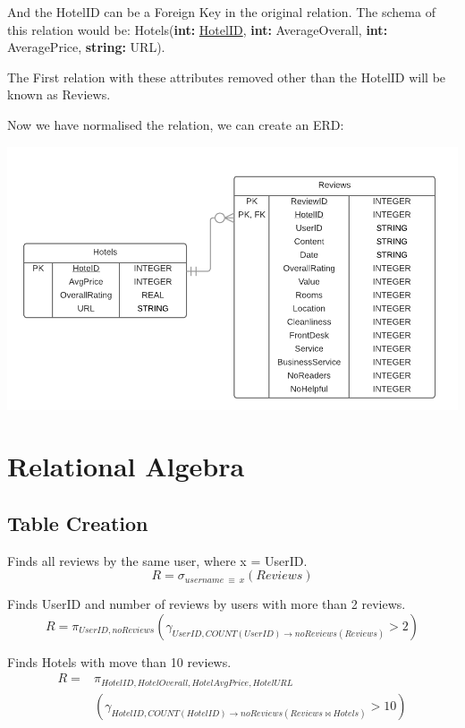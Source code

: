 \documentclass[11pt,epsfig]{article}
\begin{document}
And the HotelID can be a Foreign Key in the original relation.
The schema of this relation would be:
Hotels(\textbf{int:} \underline{HotelID}, \textbf{int:} AverageOverall, \textbf{int:} AveragePrice, \textbf{string:} URL).

The First relation with these attributes removed other than the HotelID will be known as Reviews.

Now we have normalised the relation, we can create an ERD:

\includegraphics[scale=0.6]{ERD_DIAGRAM.png} 

\section{Relational Algebra}

\subsection{Table Creation}

Finds all reviews by the same user, where x = UserID.
\begin{equation}
	R = \sigma_{username\ \equiv\ x}(Reviews)
\end{equation}

Finds UserID and number of reviews by users with more than 2 reviews.
\begin{equation}
	R =\pi_{UserID,  noReviews}(\gamma_{UserID,COUNT(UserID) \rightarrow noReviews(Reviews)} > 2)
\end{equation}

Finds Hotels with move than 10 reviews.
\begin{equation}
\begin{aligned}
	R = {} & \pi_{HotelID, HotelOverall, HotelAvgPrice, HotelURL} \\
		   & (\gamma_{HotelID,COUNT(HotelID) \rightarrow noReviews(Reviews \bowtie Hotels)} > 10)
\end{aligned}
\end{equation}
\end{document}
